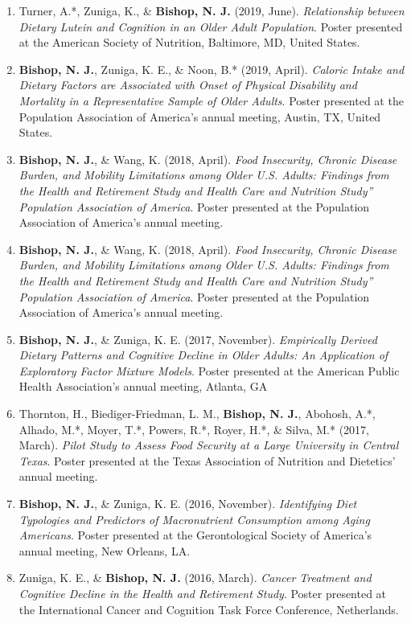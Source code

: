 \documentclass[
]{article}
\begin{document}
\begin{enumerate}
{  Short-Term Cognitive Change in a Representative Sample of Older U.S.
  Adults}. Poster presented at the American Society of Nutrition,
  Baltimore, MD, United States.
\item
  Turner, A.*, Zuniga, K., \& \textbf{Bishop, N. J.} (2019, June).
  \emph{Relationship between Dietary Lutein and Cognition in an Older
  Adult Population}. Poster presented at the American Society of
  Nutrition, Baltimore, MD, United States.
\item
  \textbf{Bishop, N. J.}, Zuniga, K. E., \& Noon, B.* (2019, April).
  \emph{Caloric Intake and Dietary Factors are Associated with Onset of
  Physical Disability and Mortality in a Representative Sample of Older
  Adults}. Poster presented at the Population Association of America's
  annual meeting, Austin, TX, United States.
\item
  \textbf{Bishop, N. J.}, \& Wang, K. (2018, April). \emph{Food
  Insecurity, Chronic Disease Burden, and Mobility Limitations among
  Older U.S. Adults: Findings from the Health and Retirement Study and
  Health Care and Nutrition Study'' Population Association of America}.
  Poster presented at the Population Association of America's annual
  meeting.
\item
  \textbf{Bishop, N. J.}, \& Wang, K. (2018, April). \emph{Food
  Insecurity, Chronic Disease Burden, and Mobility Limitations among
  Older U.S. Adults: Findings from the Health and Retirement Study and
  Health Care and Nutrition Study'' Population Association of America}.
  Poster presented at the Population Association of America's annual
  meeting.
\item
  \textbf{Bishop, N. J.}, \& Zuniga, K. E. (2017, November).
  \emph{Empirically Derived Dietary Patterns and Cognitive Decline in
  Older Adults: An Application of Exploratory Factor Mixture Models}.
  Poster presented at the American Public Health Association's annual
  meeting, Atlanta, GA
\item
  Thornton, H., Biediger-Friedman, L. M., \textbf{Bishop, N. J.},
  Abohosh, A.*, Alhado, M.*, Moyer, T.*, Powers, R.*, Royer, H.*, \&
  Silva, M.* (2017, March). \emph{Pilot Study to Assess Food Security at
  a Large University in Central Texas}. Poster presented at the Texas
  Association of Nutrition and Dietetics' annual meeting.
\item
  \textbf{Bishop, N. J.}, \& Zuniga, K. E. (2016, November).
  \emph{Identifying Diet Typologies and Predictors of Macronutrient
  Consumption among Aging Americans}. Poster presented at the
  Gerontological Society of America's annual meeting, New Orleans, LA.
\item
  Zuniga, K. E., \& \textbf{Bishop, N. J.} (2016, March). \emph{Cancer
  Treatment and Cognitive Decline in the Health and Retirement Study}.
  Poster presented at the International Cancer and Cognition Task Force
  Conference, Netherlands.
\end{enumerate}
\end{document}
